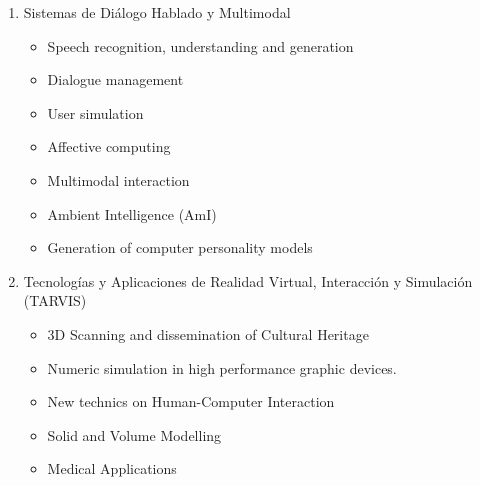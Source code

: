 {{\begin{enumerate}[itemsep=0mm]
\begin{itemize}[nosep]
            \item Métodos formales en sistemas concurrentes
            \item Computación de tiempo real y empotrada para sistemas ubicuos y de inteligencia ambiental
            \item Middlewares y marcos de desarrollo para sistemas empotrados de tiempo real distribuidos
            \item Sistemas de medición distribuido y de instrumentación 
        \end{itemize} 
        \item Sistemas de Diálogo Hablado y Multimodal
        \begin{itemize}[nosep]
            \item Speech recognition, understanding and generation
            \item Dialogue management
            \item User simulation
            \item Affective computing
            \item Multimodal interaction
            \item Ambient Intelligence (AmI)
            \item Generation of computer personality models
        \end{itemize}
        \item Tecnologías y Aplicaciones de Realidad Virtual, Interacción y Simulación (TARVIS)
        \begin{itemize}[nosep]
            \item 3D Scanning and dissemination of Cultural Heritage
            \item Numeric simulation in high performance graphic devices.
            \item New technics on Human-Computer Interaction
            \item Solid and Volume Modelling
            \item Medical Applications
        \end{itemize}
    \end{enumerate}
    }
}



